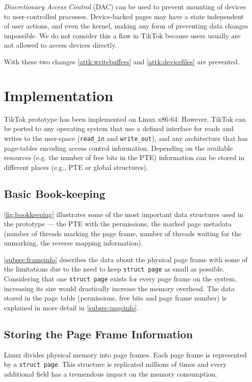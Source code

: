 \documentclass[conference]{IEEEtran}
\newcommand{\sysname}{TikTok}
\begin{document}
\emph{Discretionary Access Control} (DAC) can be used to prevent mounting of
devices to user-controlled processes. Device-backed pages may have a state
independent of user actions, and even the kernel, making any form of preventing
data changes impossible. We do not consider this a flaw in \sysname{} because
users usually are not allowed to access devices directly.

With these two changes \autoref{attk:writebuffers} and \autoref{attk:devicefiles}
are prevented.


\section{Implementation}
\label{sec:implementation}

\sysname{} prototype has been implemented on Linux x86-64. However, \sysname{} can be
ported to any operating system that use a defined interface for reads and
writes to the user-space (\texttt{read\_in} and \texttt{write\_out}), and any
architecture that has page-tables encoding access control information. Depending
on the available resources (e.g. the number of free bits in the PTE) information
can be stored in different places (e.g., PTE or global structures).

\subsection{Basic Book-keeping}
\autoref{fig:bookkeeping} illustrates some of the most important data structures
used in the prototype --- the PTE with the permissions, the marked page metadata
(number of threads marking the page frame, number of threads waiting for the
unmarking, the reverse mapping information). 

\autoref{subsec:frameinfo} describes the data about the physical page frame with
some of the limitations due to the need to keep \texttt{struct page} as small as
possible. Considering that one \texttt{struct page} exists for every page frame
on the system, increasing its size would drastically increase the memory
overhead.  The data stored in the page table (permissions, free bits and page
frame number) is explained in more detail in \autoref{subsec:pageinfo}.

\subsection{Storing the Page Frame Information}
\label{subsec:frameinfo}
Linux divides physical memory into page frames. Each page frame is represented
by a \texttt{struct page}. This structure is replicated millions of times and
every additional field has a tremendous impact on the memory consumption.
\end{document}
